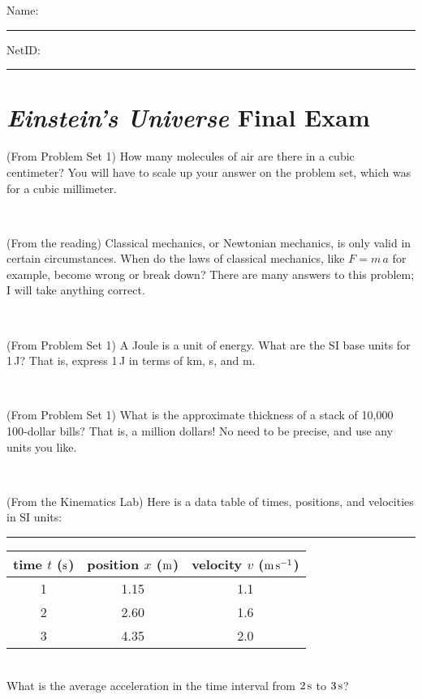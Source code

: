 \documentclass[12pt, letterpaper]{article}
\begin{document}
\noindent
Name: \rule[-1ex]{0.60\textwidth}{0.1pt}
NetID: \rule[-1ex]{0.20\textwidth}{0.1pt}

\section*{\textsl{Einstein's Universe} Final Exam}
\setcounter{problem}{1}

\begin{problem}
(From Problem Set 1)
How many molecules of air are there in a cubic centimeter?
You will have to scale up your answer on the problem set, which
was for a cubic millimeter.
\end{problem}

\vfill ~

\begin{problem}
(From the reading)
Classical mechanics, or Newtonian mechanics, is only valid in certain
circumstances. When do the laws of classical mechanics, like $F =
m\,a$ for example, become wrong or break down? There are many answers
to this problem; I will take anything correct.
\end{problem}

\vfill ~

\begin{problem}
(From Problem Set 1)
A Joule is a unit of energy. What are the SI base units for 1\,J? That is,
express 1\,J in terms of km, s, and m.
\end{problem}

\vfill ~

\begin{problem}
(From Problem Set 1)
What is the approximate thickness of a stack of 10,000 100-dollar bills?
That is, a million dollars!
No need to be precise, and use any units you like.
\end{problem}

\vfill ~

\clearpage

\begin{problem}
(From the Kinematics Lab)
Here is a data table of times, positions, and velocities in SI units:\\
\rule{1.0in}{0pt}\begin{tabular}{c|c|c}
time $t$ ($\mathrm{s}$) & position $x$ ($\mathrm{m}$) & velocity $v$ ($\mathrm{m}\,\mathrm{s}^{-1}$) \\
\hline
1 & 1.15 & 1.1 \\
2 & 2.60 & 1.6 \\
3 & 4.35 & 2.0 \\
\hline
\end{tabular}\\
What is the average acceleration in the time interval from $2\,\mathrm{s}$ to $3\,\mathrm{s}$?
\end{problem}
\end{document}
